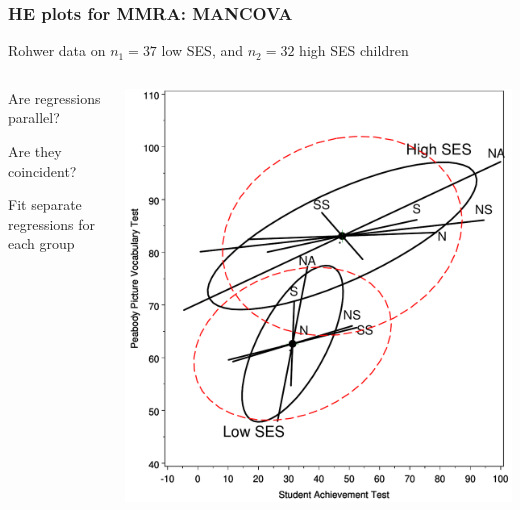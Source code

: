 \begin{frame}
  \frametitle{HE plots for MMRA: MANCOVA}
  \begin{itemize*}
	\item Rohwer data on $n_1=37$ low SES, and $n_2=32$ high SES children
  \end{itemize*}
  \begin{columns}
  	\begin{column}[T]{.4\textwidth}
	\begin{itemize*}
	  \item Are regressions parallel?  
	  \item Are they coincident?
	  \item Fit separate regressions for each group
	\end{itemize*}
	\end{column}
  	\begin{column}[T]{.6\textwidth}
	  \includegraphics[width=.95\textwidth,clip]{fig/mreg5}
	\end{column}
  \end{columns}
\end{frame}


